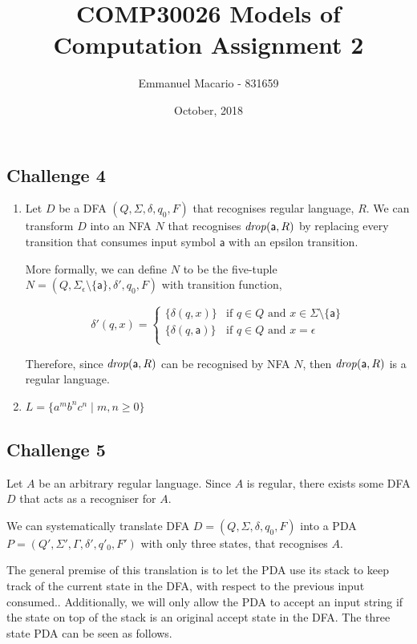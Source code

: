 \documentclass[12pt]{article}
\author{Emmanuel Macario - 831659}
\title{COMP30026 Models of Computation Assignment 2}
\date{October, 2018}
\newcommand{\id}[1]{\mbox{\textit{#1}}}
\newcommand{\ma}{\mathsf{a}}
\begin{document}
\maketitle

\subsection*{Challenge 4}

\begin{enumerate}
\item
Let $D$ be a DFA $(Q,\Sigma,\delta,q_0,F)$ that recognises regular language, $R$. We can transform 
$D$ into an NFA $N$ that recognises $\id{drop}(\ma,R)$ by replacing every transition that consumes input symbol
$\ma$ with an epsilon transition.

\bigskip
\noindent
More formally, we can define $N$ to be the five-tuple $N=(Q,\Sigma_\epsilon \setminus \{\ma\},\delta',q_0,F)$
with transition function,

\[
  \delta'(q, x) =
  \begin{cases}
  	\{\delta (q, x)\}     & \text{if $q \in Q$ and $x \in \Sigma \setminus \{\ma\}$} \\
      \{\delta (q, \ma)\} & \text{if $q \in Q$ and $x = \epsilon$} \\
  \end{cases}
\]

\bigskip
\noindent
Therefore, since $\id{drop}(\ma,R)$ can be recognised by NFA $N$, then $\id{drop}(\ma,R)$ is a regular language.
\bigskip

\item $L=\{a^m b^n c^n \mid m, n \geq 0\}$
\end{enumerate}
\bigskip


\subsection*{Challenge 5}

Let $A$ be an arbitrary regular language. Since $A$ is regular, there exists some DFA $D$ that acts as a recogniser for $A$.

\bigskip
\noindent
We can systematically translate DFA $D=(Q,\Sigma,\delta,q_0,F)$ into a PDA $P=(Q',\Sigma',\Gamma,\delta',q'_0,F')$ with only three states, that recognises $A$.

\bigskip
\noindent
The general premise of this translation is to let the PDA use its stack to keep track
of the current state in the DFA, with respect to the previous input consumed.. Additionally, 
we will only allow the PDA to accept an input string if the state on top of the stack is an original 
accept state in the DFA. The three state PDA can be seen as follows.
\end{document}
